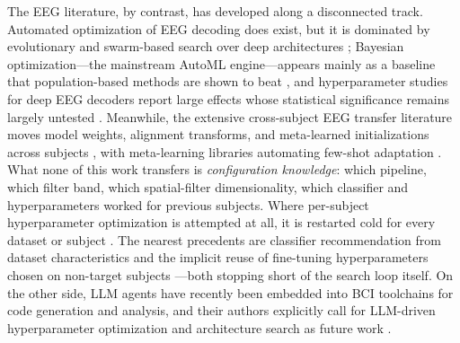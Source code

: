 The EEG literature, by contrast, has developed along a disconnected track. Automated optimization of EEG decoding does exist, but it is dominated by evolutionary and swarm-based search over deep architectures \cite{NakisaEtAl2018, DuanEtAl2023, ZhuEtAl2025, AvvalEtAl2025}; Bayesian optimization---the mainstream AutoML engine---appears mainly as a baseline that population-based methods are shown to beat \cite{NakisaEtAl2018}, and hyperparameter studies for deep EEG decoders report large effects whose statistical significance remains largely untested \cite{CooneyEtAl2020}. Meanwhile, the extensive cross-subject EEG transfer literature moves model weights, alignment transforms, and meta-learned initializations across subjects \cite{SchirrmeisterEtAl2017, BerdyshevEtAl2024, HuangEtAl2025, AristimunhaEtAl2025}, with meta-learning libraries automating few-shot adaptation \cite{BerdyshevEtAl2024}. What none of this work transfers is \emph{configuration knowledge}: which pipeline, which filter band, which spatial-filter dimensionality, which classifier and hyperparameters worked for previous subjects. Where per-subject hyperparameter optimization is attempted at all, it is restarted cold for every dataset or subject \cite{ZhangEtAl2024, BerdyshevEtAl2024}. The nearest precedents are classifier recommendation from dataset characteristics \cite{AnarakiEtAl2024} and the implicit reuse of fine-tuning hyperparameters chosen on non-target subjects \cite{BerdyshevEtAl2024}---both stopping short of the search loop itself. On the other side, LLM agents have recently been embedded into BCI toolchains for code generation and analysis, and their authors explicitly call for LLM-driven hyperparameter optimization and architecture search as future work \cite{KapitonovaBall2024}.


